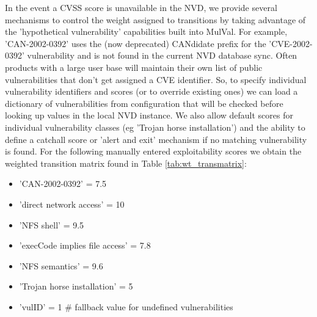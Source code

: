 In the event a CVSS score is unavailable in the NVD, we provide several mechanisms to control the weight assigned to transitions by taking advantage of the 'hypothetical vulnerability' capabilities built into MulVal. For example, 'CAN-2002-0392' uses the (now deprecated) CANdidate prefix for the 'CVE-2002-0392' vulnerability and is not found in the current NVD database sync. Often products with a large user base will maintain their own list of public vulnerabilities that don't get assigned a CVE identifier. So, to specify individual vulnerability identifiers and scores (or to override existing ones) we can load a dictionary of vulnerabilities from configuration that will be checked before looking up values in the local NVD instance. We also allow default scores for individual vulnerability classes (eg 'Trojan horse installation') and the ability to define a catchall score or 'alert and exit' mechanism if no matching vulnerability is found. For the following manually entered exploitability scores we obtain the weighted transition matrix found in Table \ref{tab:wt_transmatrix}:


\begin{itemize}
\item 'CAN-2002-0392' = 7.5
\item 'direct network access' = 10
\item 'NFS shell' = 9.5
\item 'execCode implies file access' = 7.8
\item 'NFS semantics' = 9.6
\item 'Trojan horse installation' = 5
\item 'vulID' = 1 \# fallback value for undefined vulnerabilities
\end{itemize}





